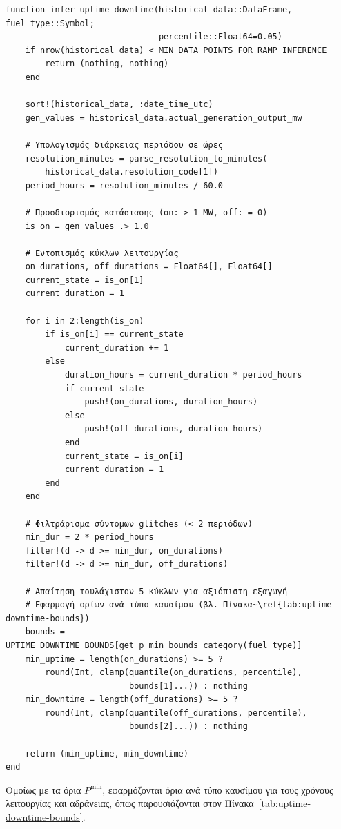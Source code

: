 \begin{samepage}
\begin{verbatim}
function infer_uptime_downtime(historical_data::DataFrame, fuel_type::Symbol;
                               percentile::Float64=0.05)
    if nrow(historical_data) < MIN_DATA_POINTS_FOR_RAMP_INFERENCE
        return (nothing, nothing)
    end

    sort!(historical_data, :date_time_utc)
    gen_values = historical_data.actual_generation_output_mw

    # Υπολογισμός διάρκειας περιόδου σε ώρες
    resolution_minutes = parse_resolution_to_minutes(
        historical_data.resolution_code[1])
    period_hours = resolution_minutes / 60.0

    # Προσδιορισμός κατάστασης (on: > 1 MW, off: = 0)
    is_on = gen_values .> 1.0

    # Εντοπισμός κύκλων λειτουργίας
    on_durations, off_durations = Float64[], Float64[]
    current_state = is_on[1]
    current_duration = 1

    for i in 2:length(is_on)
        if is_on[i] == current_state
            current_duration += 1
        else
            duration_hours = current_duration * period_hours
            if current_state
                push!(on_durations, duration_hours)
            else
                push!(off_durations, duration_hours)
            end
            current_state = is_on[i]
            current_duration = 1
        end
    end

    # Φιλτράρισμα σύντομων glitches (< 2 περιόδων)
    min_dur = 2 * period_hours
    filter!(d -> d >= min_dur, on_durations)
    filter!(d -> d >= min_dur, off_durations)

    # Απαίτηση τουλάχιστον 5 κύκλων για αξιόπιστη εξαγωγή
    # Εφαρμογή ορίων ανά τύπο καυσίμου (βλ. Πίνακα~\ref{tab:uptime-downtime-bounds})
    bounds = UPTIME_DOWNTIME_BOUNDS[get_p_min_bounds_category(fuel_type)]
    min_uptime = length(on_durations) >= 5 ?
        round(Int, clamp(quantile(on_durations, percentile),
                         bounds[1]...)) : nothing
    min_downtime = length(off_durations) >= 5 ?
        round(Int, clamp(quantile(off_durations, percentile),
                         bounds[2]...)) : nothing

    return (min_uptime, min_downtime)
end
\end{verbatim}
\end{samepage}

Ομοίως με τα όρια $P^{\min}$, εφαρμόζονται όρια ανά τύπο καυσίμου για τους χρόνους λειτουργίας και αδράνειας, όπως παρουσιάζονται στον Πίνακα~\ref{tab:uptime-downtime-bounds}.

